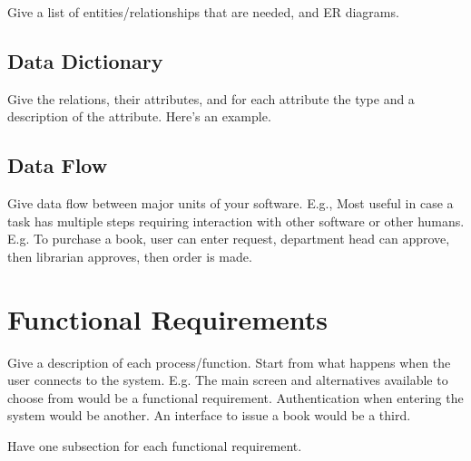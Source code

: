 \documentclass[a4wide]{article}
\begin{document}
Give a list of entities/relationships that are needed,
and ER diagrams.

\subsection{Data Dictionary}

Give the relations, their attributes, and for each attribute the
type and a description of the attribute.  Here's an example.


\subsection{Data Flow}

Give data flow between major units of your software.
E.g., 
Most useful in case a task has multiple steps requiring interaction
with other software or other humans.
E.g. To purchase a book, user can enter request, department head can
approve, then librarian approves, then order is made.

\section{Functional Requirements}

Give a description of each process/function.
Start from what happens when the user connects to the system.
E.g.  The main screen and alternatives available to choose from would be 
a functional requirement.
Authentication when entering the system would be another.
An interface to issue a book would be a third.

Have one subsection for each functional requirement.
\end{document}
